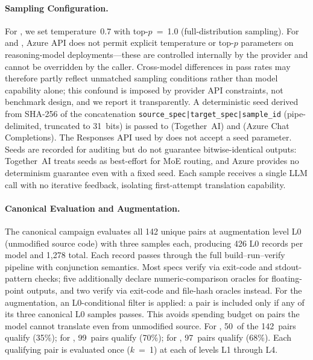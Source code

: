 \paragraph{Sampling Configuration.}
\label{sec:sampling-config}
For \qwenshort{}, we set temperature~0.7 with top-$p$~=~1.0 (full-distribution sampling). For \gptnew{} and \codex{}, Azure API does not permit explicit temperature or top-$p$ parameters on reasoning-model deployments---these are controlled internally by the provider and cannot be overridden by the caller. Cross-model differences in pass rates may therefore partly reflect unmatched sampling conditions rather than model capability alone; this confound is imposed by provider API constraints, not benchmark design, and we report it transparently. A deterministic seed derived from SHA-256 of the concatenation \texttt{source\_spec|target\_spec|sample\_id} (pipe-delimited, truncated to 31~bits) is passed to \qwenshort{} (Together~AI) and \gptnew{} (Azure Chat Completions). The Responses API used by \codex{} does not accept a seed parameter. Seeds are recorded for auditing but do not guarantee bitwise-identical outputs: Together~AI treats seeds as best-effort for MoE routing, and Azure provides no determinism guarantee even with a fixed seed. Each sample receives a single LLM call with no iterative feedback, isolating first-attempt translation capability.

\paragraph{Canonical Evaluation and Augmentation.}
The canonical campaign evaluates all 142 unique pairs at augmentation level L0 (unmodified source code) with three samples each, producing 426 L0 records per model and 1{,}278 total. Each record passes through the full build--run--verify pipeline with conjunction semantics. Most specs verify via exit-code and stdout-pattern checks; five additionally declare numeric-comparison oracles for floating-point outputs, and two verify via exit-code and file-hash oracles instead.
For the augmentation, an L0-conditional filter is applied: a pair is included only if any of its three canonical L0 samples passes. This avoids spending budget on pairs the model cannot translate even from unmodified source. For \qwenshort{}, 50~of the 142~pairs qualify (35\%); for \gptnew{}, 99~pairs qualify (70\%); for \codex{}, 97~pairs qualify (68\%). Each qualifying pair is evaluated once ($k$~=~1) at each of levels L1 through L4.

